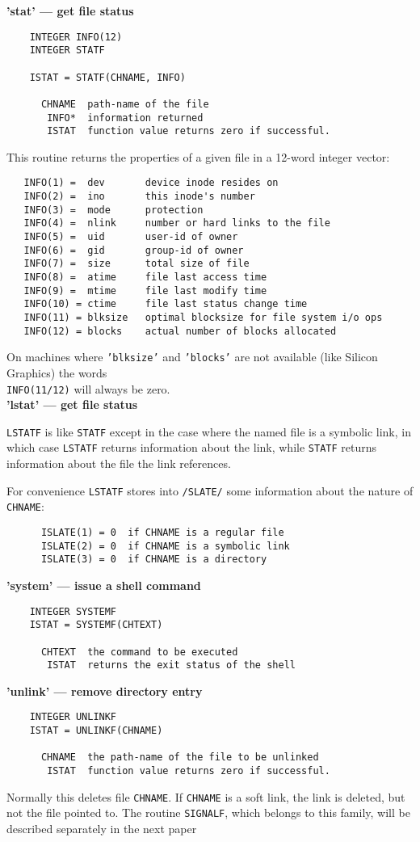 \newpage
{\bf 'stat' --- get file status}
\begin{verbatim}
    INTEGER INFO(12)
    INTEGER STATF
 
    ISTAT = STATF(CHNAME, INFO)
 
      CHNAME  path-name of the file
       INFO*  information returned
       ISTAT  function value returns zero if successful.
\end{verbatim}
This routine returns the properties of a given file
in a 12-word integer vector:
\begin{verbatim}
   INFO(1) =  dev       device inode resides on
   INFO(2) =  ino       this inode's number
   INFO(3) =  mode      protection
   INFO(4) =  nlink     number or hard links to the file
   INFO(5) =  uid       user-id of owner
   INFO(6) =  gid       group-id of owner
   INFO(7) =  size      total size of file
   INFO(8) =  atime     file last access time
   INFO(9) =  mtime     file last modify time
   INFO(10) = ctime     file last status change time
   INFO(11) = blksize   optimal blocksize for file system i/o ops
   INFO(12) = blocks    actual number of blocks allocated
\end{verbatim}
On machines where {\tt 'blksize'} and {\tt 'blocks'} are not available
(like Silicon Graphics) the words \\
{\tt INFO(11/12)} will always be zero. \\
 
{\bf 'lstat' --- get file status}
 
{\tt LSTATF} is like {\tt STATF} except in the case where the named file
is a symbolic link, in which case {\tt LSTATF} returns information
about the link, while {\tt STATF} returns information about
the file the link references.
 
For convenience {\tt LSTATF} stores into {\tt /SLATE/} some
information about the nature of {\tt CHNAME}:
\begin{verbatim}
      ISLATE(1) = 0  if CHNAME is a regular file
      ISLATE(2) = 0  if CHNAME is a symbolic link
      ISLATE(3) = 0  if CHNAME is a directory
\end{verbatim}
 
{\bf 'system' --- issue a shell command}
\begin{verbatim}
    INTEGER SYSTEMF
    ISTAT = SYSTEMF(CHTEXT)
 
      CHTEXT  the command to be executed
       ISTAT  returns the exit status of the shell
\end{verbatim}
\newpage
{\bf 'unlink' --- remove directory entry}
\begin{verbatim}
    INTEGER UNLINKF
    ISTAT = UNLINKF(CHNAME)
 
      CHNAME  the path-name of the file to be unlinked
       ISTAT  function value returns zero if successful.
\end{verbatim}
Normally this deletes file {\tt CHNAME}. If {\tt CHNAME} is a soft link,
the link is deleted, but not the file pointed to.
\Notes
The routine {\tt SIGNALF}, which belongs to this family,
will be described separately in the next paper \\[1mm]
 
